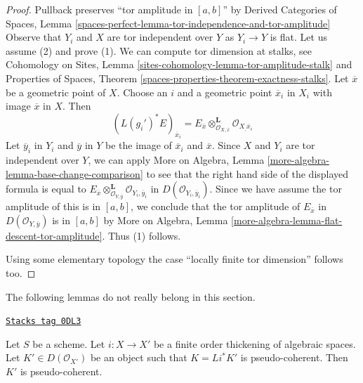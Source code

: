 \begin{proof}
Pullback preserves ``tor amplitude in $[a, b]$'' by
Derived Categories of Spaces, Lemma
\ref{spaces-perfect-lemma-tor-independence-and-tor-amplitude}
Observe that $Y_i$ and $X$ are tor independent over $Y$
as $Y_i \to Y$ is flat. Let us assume (2) and prove (1).
We can compute tor dimension at stalks, see
Cohomology on Sites, Lemma \ref{sites-cohomology-lemma-tor-amplitude-stalk}
and Properties of Spaces, Theorem
\ref{spaces-properties-theorem-exactness-stalks}.
Let $\overline{x}$ be a geometric point of $X$. Choose
an $i$ and a geometric point $\overline{x}_i$ in $X_i$ with image
$\overline{x}$ in $X$. Then
$$
(L(g_i')^*E)_{\overline{x}_i} =
E_{\overline{x}}
\otimes_{\mathcal{O}_{X, \overline{x}}}^\mathbf{L}
\mathcal{O}_{X_, \overline{x}_i}
$$
Let $\overline{y}_i$ in $Y_i$ and $\overline{y}$ in $Y$
be the image of $\overline{x}_i$ and $\overline{x}$.
Since $X$ and $Y_i$ are tor independent over $Y$, we can apply
More on Algebra, Lemma \ref{more-algebra-lemma-base-change-comparison}
to see that the right hand side of the displayed formula is equal to
$E_{\overline{x}}
\otimes_{\mathcal{O}_{Y, \overline{y}}}^\mathbf{L}
\mathcal{O}_{Y_i, \overline{y}_i}$
in $D(\mathcal{O}_{Y_i, \overline{y}_i})$.
Since we have assume the tor amplitude of this is in
$[a, b]$, we conclude that the tor amplitude of
$E_{\overline{x}}$ in $D(\mathcal{O}_{Y, \overline{y}})$
is in $[a, b]$ by More on Algebra, Lemma
\ref{more-algebra-lemma-flat-descent-tor-amplitude}.
Thus (1) follows.

\medskip\noindent
Using some elementary topology the case
``locally finite tor dimension'' follows too.
\end{proof}

The following lemmas do not really belong in this section.

\begin{lemma}
\label{spaces-more-morphisms-lemma-thickening-pseudo-coherent}
\href{https://stacks.math.columbia.edu/tag/0DL3}{\texttt{Stacks tag 0DL3}}

Let $S$ be a scheme. Let $i : X \to X'$ be a finite order thickening of
algebraic spaces. Let $K' \in D(\mathcal{O}_{X'})$ be an object such that
$K = Li^*K'$ is pseudo-coherent. Then $K'$ is pseudo-coherent.
\end{lemma}

